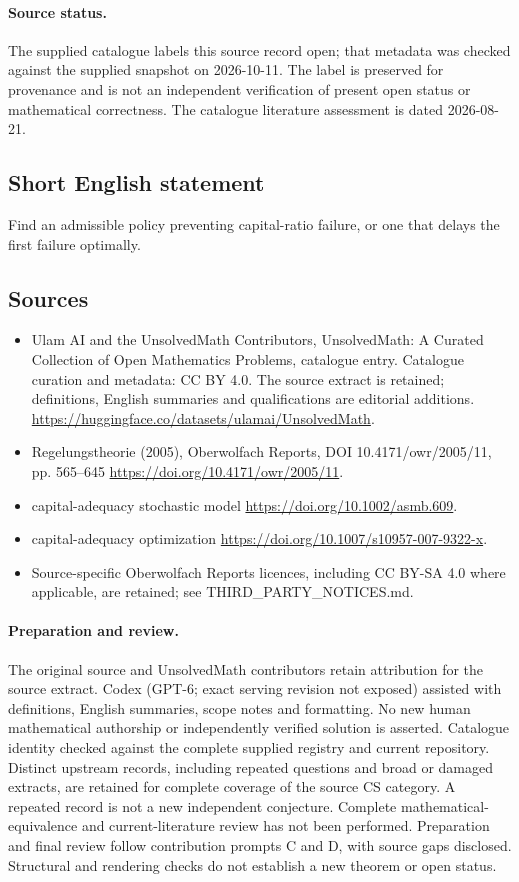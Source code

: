 \documentclass[11pt]{article}
\begin{document}
\paragraph{Source status.}
The supplied catalogue labels this source record open; that metadata was checked against the supplied snapshot on 2026-10-11. The label is preserved for provenance and is not an independent verification of present open status or mathematical correctness. The catalogue literature assessment is dated 2026-08-21.
\subsection{Short English statement}
Find an admissible policy preventing capital-ratio failure, or one that delays the first failure optimally.
\subsection{Sources}
\begin{itemize}
\item[S1] Ulam AI and the UnsolvedMath Contributors, UnsolvedMath: A Curated Collection of Open Mathematics Problems, catalogue entry. Catalogue curation and metadata: CC BY 4.0. The source extract is retained; definitions, English summaries and qualifications are editorial additions.
\url{https://huggingface.co/datasets/ulamai/UnsolvedMath}.
\item[S2] Regelungstheorie (2005), Oberwolfach Reports, DOI 10.4171/owr/2005/11, pp. 565--645
\url{https://doi.org/10.4171/owr/2005/11}.
\item[S3] capital-adequacy stochastic model
\url{https://doi.org/10.1002/asmb.609}.
\item[S4] capital-adequacy optimization
\url{https://doi.org/10.1007/s10957-007-9322-x}.
\item Source-specific Oberwolfach Reports licences, including CC BY-SA 4.0 where applicable, are retained; see THIRD\_PARTY\_NOTICES.md.
\end{itemize}
\paragraph{Preparation and review.}
The original source and UnsolvedMath contributors retain attribution for the source extract. Codex (GPT-6; exact serving revision not exposed) assisted with definitions, English summaries, scope notes and formatting. No new human mathematical authorship or independently verified solution is asserted. Catalogue identity checked against the complete supplied registry and current repository. Distinct upstream records, including repeated questions and broad or damaged extracts, are retained for complete coverage of the source CS category. A repeated record is not a new independent conjecture. Complete mathematical-equivalence and current-literature review has not been performed. Preparation and final review follow contribution prompts C and D, with source gaps disclosed. Structural and rendering checks do not establish a new theorem or open status.
\label{end:statement}
\end{document}
